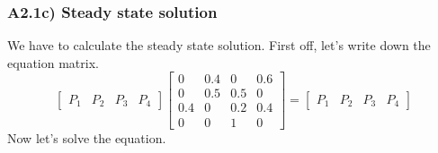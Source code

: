 \documentclass[12pt]{report}
\begin{document}
\subsubsection*{A2.1c) Steady state solution}
We have to calculate the steady state solution. First off, let's write down the equation matrix.
$$
	\left[
	\begin{matrix}
		P_1 & P_2 & P_3 & P_4
	\end{matrix}
	\right] \left[
	\begin{matrix}
		0 & 0.4 & 0 & 0.6\\
		0 & 0.5 & 0.5 & 0\\
		0.4 & 0 & 0.2 & 0.4\\
		0 & 0 & 1 & 0
	\end{matrix}
	\right] = \left[
	\begin{matrix}
		P_1 & P_2 & P_3 & P_4
	\end{matrix}
	\right]
$$
Now let's solve the equation.
\end{document}
